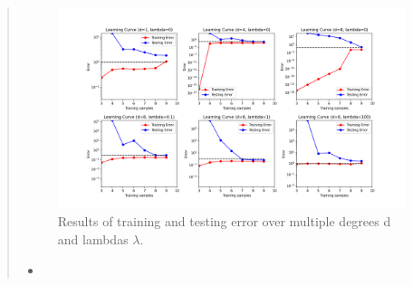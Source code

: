 \begin{quote}
    \FloatBarrier
    \begin{figure}
	\captionsetup{labelformat=empty}	
	\caption{Results of training and testing error over multiple degrees d and lambdas $\lambda$.}
	\includegraphics[scale=0.5]{./images/fig2.png} 
	\centering
    \end{figure}
    \FloatBarrier
    \begin{itemize}
	\item[] 
    \end{itemize}
\end{quote}
